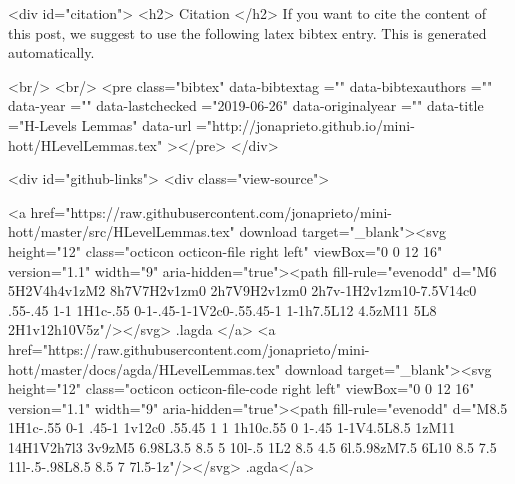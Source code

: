   
  <div id="citation">
  <h2> Citation </h2>
  If you want to cite the content of this post,
  we suggest to use the following latex bibtex entry.
  This is generated automatically.

  <br/>
  <br/>
  <pre class="bibtex"
       data-bibtextag =""
       data-bibtexauthors =""
       data-year =""
       data-lastchecked ="2019-06-26"
       data-originalyear =""
       data-title ="H-Levels Lemmas"
       data-url ="http://jonaprieto.github.io/mini-hott/HLevelLemmas.tex"
  ></pre>
  </div>
  

  <div id="github-links">
    <div class="view-source">
      
        <a href="https://raw.githubusercontent.com/jonaprieto/mini-hott/master/src/HLevelLemmas.tex" download target="_blank"><svg height="12" class="octicon octicon-file right left" viewBox="0 0 12 16" version="1.1" width="9" aria-hidden="true"><path fill-rule="evenodd" d="M6 5H2V4h4v1zM2 8h7V7H2v1zm0 2h7V9H2v1zm0 2h7v-1H2v1zm10-7.5V14c0 .55-.45 1-1 1H1c-.55 0-1-.45-1-1V2c0-.55.45-1 1-1h7.5L12 4.5zM11 5L8 2H1v12h10V5z"/></svg> .lagda </a>
        <a href="https://raw.githubusercontent.com/jonaprieto/mini-hott/master/docs/agda/HLevelLemmas.tex" download target="_blank"><svg height="12" class="octicon octicon-file-code right left" viewBox="0 0 12 16" version="1.1" width="9" aria-hidden="true"><path fill-rule="evenodd" d="M8.5 1H1c-.55 0-1 .45-1 1v12c0 .55.45 1 1 1h10c.55 0 1-.45 1-1V4.5L8.5 1zM11 14H1V2h7l3 3v9zM5 6.98L3.5 8.5 5 10l-.5 1L2 8.5 4.5 6l.5.98zM7.5 6L10 8.5 7.5 11l-.5-.98L8.5 8.5 7 7l.5-1z"/></svg> .agda</a>
      
